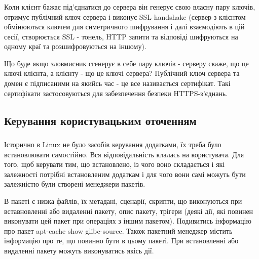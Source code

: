 \documentclass[t]{beamer}  %
\begin{document}
\begin{frame}
 	\frametitle{\insertsection} 
 	\framesubtitle{\insertsubsection}
Коли клієнт бажає під'єднатися до сервера він генерує свою власну пару ключів, отримує публічний ключ сервера і виконує SSL handshake (сервер з клієнтом обмінюються ключем для симетричного шифрування і далі взаємодіють в цій сесії, створюється SSL - тонель, HTTP запити та відповіді шифруються на одному краї та розшифровуються на іншому). 

Що буде якщо зловмисник сгенерує в себе пару ключів - серверу скаже, що це ключі клієнта, а клієнту - що це ключі сервера?  Публічний ключ сервера та домен є підписаними на якийсь час - це все називається сертифікат. Такі сертифікати застосовуються для забезпечення безпеки HTTPS-з'єднань.
\end{frame}

\subsection{Керування  користувацьким оточенням}

\begin{frame}
 	\frametitle{\insertsection} 
 	\framesubtitle{\insertsubsection}
Історично в Linux не було засобів керування додатками, їх треба було встановлювати самостійно. Вся відповідальність клалась на користувача. Для того, щоб керувати тим, що встановлено, із чого воно складається і які залежності потрібні встановленим додаткам і для чого вони самі можуть бути залежністю були створені менеджери пакетів.

В пакеті є низка файлів, їх метадані, сценарії, скрипти, що виконуються при вставновленні або видаленні пакету, опис пакету, трігери (деякі дії, які повинен виконувати цей пакет при операціях з іншим пакетом).
Подивитись інформацію про пакет apt-cache show glibc-source. Також пакетний менеджер містить інформацію про те, що повинно бути в цьому пакеті. При встановленні або видаленні пакету можуть виконуватись якісь дії.
\end{frame}
\end{document}
